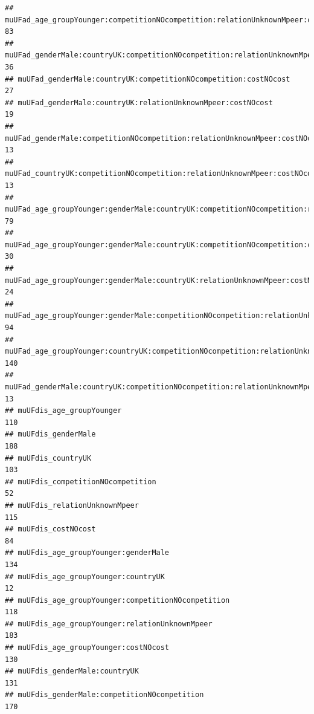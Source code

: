 \documentclass[
]{article}
\begin{document}
\begin{verbatim}
## muUFad_age_groupYounger:competitionNOcompetition:relationUnknownMpeer:costNOcost                   83
## muUFad_genderMale:countryUK:competitionNOcompetition:relationUnknownMpeer                          36
## muUFad_genderMale:countryUK:competitionNOcompetition:costNOcost                                    27
## muUFad_genderMale:countryUK:relationUnknownMpeer:costNOcost                                        19
## muUFad_genderMale:competitionNOcompetition:relationUnknownMpeer:costNOcost                         13
## muUFad_countryUK:competitionNOcompetition:relationUnknownMpeer:costNOcost                          13
## muUFad_age_groupYounger:genderMale:countryUK:competitionNOcompetition:relationUnknownMpeer         79
## muUFad_age_groupYounger:genderMale:countryUK:competitionNOcompetition:costNOcost                   30
## muUFad_age_groupYounger:genderMale:countryUK:relationUnknownMpeer:costNOcost                       24
## muUFad_age_groupYounger:genderMale:competitionNOcompetition:relationUnknownMpeer:costNOcost        94
## muUFad_age_groupYounger:countryUK:competitionNOcompetition:relationUnknownMpeer:costNOcost        140
## muUFad_genderMale:countryUK:competitionNOcompetition:relationUnknownMpeer:costNOcost               13
## muUFdis_age_groupYounger                                                                          110
## muUFdis_genderMale                                                                                188
## muUFdis_countryUK                                                                                 103
## muUFdis_competitionNOcompetition                                                                   52
## muUFdis_relationUnknownMpeer                                                                      115
## muUFdis_costNOcost                                                                                 84
## muUFdis_age_groupYounger:genderMale                                                               134
## muUFdis_age_groupYounger:countryUK                                                                 12
## muUFdis_age_groupYounger:competitionNOcompetition                                                 118
## muUFdis_age_groupYounger:relationUnknownMpeer                                                     183
## muUFdis_age_groupYounger:costNOcost                                                               130
## muUFdis_genderMale:countryUK                                                                      131
## muUFdis_genderMale:competitionNOcompetition                                                       170

\end{verbatim}
\end{document}
